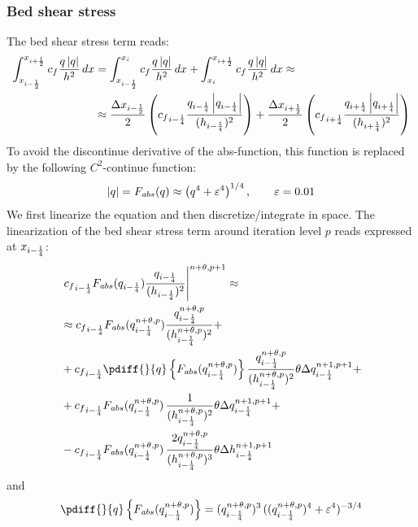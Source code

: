 \subsubsection{Bed shear stress}
The bed shear stress term reads:
\begin{align}
    \int_{x_{i-\frac{1}{2}}}^{x_{i+\frac{1}{2}}} c_f\frac{q\left\lvert q \right\rvert}{h^2} \,dx  & = \int_{x_{i-\frac{1}{2}}}^{x_{i}} c_f\frac{q\left\lvert q \right\rvert}{h^2} \,dx +
    \int_{x_{i}}^{x_{i+\frac{1}{2}}} c_f\frac{q\left\lvert q \right\rvert}{h^2} \,dx \approx
    \\
    & \approx \frac{\Delta x_{i-\frac{1}{2}}}{2} \left( {c_f}_{i-\frac{1}{4}}\frac{q_{i-\frac{1}{4}}\left\lvert q_{i-\frac{1}{4}} \right\rvert}{(h_{i-\frac{1}{4}})^2}  \right)  +
    \frac{\Delta x_{i+\frac{1}{2}}}{2} \left( {c_f}_{i+\frac{1}{4}}\frac{q_{i+\frac{1}{4}}\left\lvert q_{i+\frac{1}{4}} \right\rvert}{(h_{i+\frac{1}{4}})^2} \right)
\end{align}
To avoid the discontinue derivative of the abs-function, this function is replaced by the following  $C^2$-continue function:
\begin{align}
    \left\lvert q \right\rvert = F_{\mathit abs}(q) \approx \left( q^4 + \varepsilon^4 \right)^{1/4}, \qquad \varepsilon = 0.01
    \label{eq:continue_abs}
\end{align}
We first linearize the equation and then discretize/integrate in space.
The linearization of the bed shear stress term around iteration level $p$ reads expressed at $x_{i-\frac{1}{4}}$:
%
\begin{align}
    & \left.  {c_f}_{i-\quart} \Fabs{q_{i-\quart}} \frac{q_{i-\quart}}{(h_{i-\quart})^2} \right|^{n+\theta, p+1} \approx
    \\
    & \approx {c_f}_{i-\quart} \Fabs{q^{n+\theta, p}_{i-\quart}}  \frac{q^{n+\theta, p}_{i-\quart}}{(h^{n+\theta, p}_{i-\quart})^2} +
    \nonumber \\
    & + {c_f}_{i-\quart} \pdiff{}{q}\left\{ \Fabs{q^{n+\theta, p}_{i-\quart}} \right\}   \frac{q^{n+\theta, p}_{i-\quart}}{(h^{n+\theta, p}_{i-\quart})^2} \theta \Delta q^{n+1, p+1}_{i-\quart} +
    \nonumber \\
    & + {c_f}_{i-\quart} \Fabs{q^{n+\theta, p}_{i-\quart}}\,  \frac{ 1 }{ (h^{n+\theta, p}_{i-\quart})^2 } \theta \Delta q^{n+1, p+1}_{i-\quart} +
    \nonumber \\
    & - {c_f}_{i-\quart} \Fabs{q^{n+\theta, p}_{i-\quart}}\, \frac{2 q^{n+\theta, p}_{i-\quart}}{(h^{n+\theta, p}_{i-\quart})^3} \theta \Delta h^{n+1, p+1}_{i-\quart}
\end{align}
and
\begin{align}
    \pdiff{}{q}\left\{ \Fabs{q^{n+\theta, p}_{i-\quart}} \right\} =
    (q^{n+\theta, p}_{i-\quart})^3\,((q^{n+\theta, p}_{i-\quart})^4 + \eps^4)^{-3/4}
\end{align}
